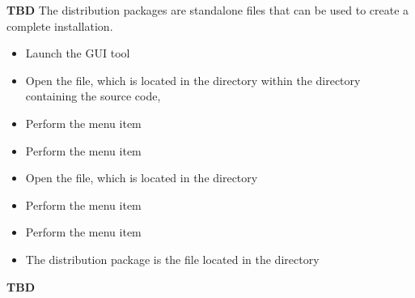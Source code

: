 \tertiaryEnd{}
\textbf{TBD}
\tertiaryEnd{}
\secondaryEnd{}
The distribution packages are standalone files that can be used to create a complete
\mplusm{} installation.
\begin{itemize}
\item Launch the  GUI tool
\item Open the  file, which is located in the
 directory within the directory containing the \mplusm{} source
code, 
\item Perform the menu item 
\item Perform the menu item 
\item Open the  file, which is located in the  directory
\item Perform the menu item 
\item Perform the menu item 
\item The distribution package is the  file located in the
 directory
\end{itemize}
\tertiaryEnd{}
\textbf{TBD}
\tertiaryEnd{}
\secondaryEnd{}
\appendixEnd{}

